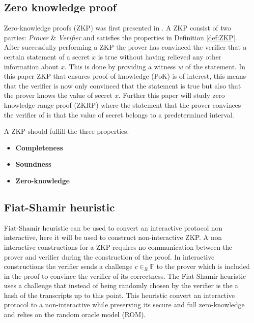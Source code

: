 \subsection*{Zero knowledge proof}
Zero-knowledge proofs  (ZKP) was first presented in \cite{OG_ZKP}. A ZKP consist of two parties: \textit{Prover} \& \textit{Verifier} and satisfies the properties  in Definition \ref{def:ZKP}. After successfully performing a ZKP the prover has convinced the verifier that a certain statement of a secret $x$ is true without having relieved any other information about $x$. This is done by providing a witness $w$ of the statement. In this paper ZKP that ensures proof of knowledge (PoK) is of interest,  this means that the verifier is now only convinced that the statement is true but also that the prover knows the value of secret $x$.  Further this paper will study zero knowledge range proof (ZKRP) where the statement that the prover convinces the verifier of is that the value of secret belongs to a predetermined interval.

\begin{Mydef}
\label{def:ZKP}
A ZKP should fulfill the three properties: 
\begin{itemize}
\item \textbf{Completeness} 
\item \textbf{Soundness} 
\item  \textbf{Zero-knowledge}
\end{itemize}
\end{Mydef}

\subsection*{Fiat-Shamir heuristic}
 Fiat-Shamir heuristic \cite{Fiat-Shamir} can be used to convert an interactive protocol  non interactive, here it will be used to construct non-interactive ZKP. A non interactive constructions for a ZKP requires no communication between the prover and verifier during the construction of the proof. In interactive constructions the verifier sends a challenge $c\in_R\mathds{F}$ to the prover which is included in the proof to convince the verifier of its correctness. The Fiat-Shamir heuristic uses a challenge that instead of being randomly chosen by the verifier is the a hash of the transcripts up to this point. This heuristic convert an interactive protocol to a non-interactive while preserving its secure and full zero-knowledge and relies on the random oracle model (ROM). 

